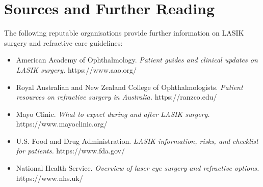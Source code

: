\section*{Sources and Further Reading}
The following reputable organisations provide further information on LASIK surgery and refractive care guidelines:
\begin{itemize}
    \item American Academy of Ophthalmology. \textit{Patient guides and clinical updates on LASIK surgery.} https://www.aao.org/
    \item Royal Australian and New Zealand College of Ophthalmologists. \textit{Patient resources on refractive surgery in Australia.} https://ranzco.edu/
    \item Mayo Clinic. \textit{What to expect during and after LASIK surgery.} https://www.mayoclinic.org/
    \item U.S. Food and Drug Administration. \textit{LASIK information, risks, and checklist for patients.} https://www.fda.gov/
    \item National Health Service. \textit{Overview of laser eye surgery and refractive options.} https://www.nhs.uk/
\end{itemize}
